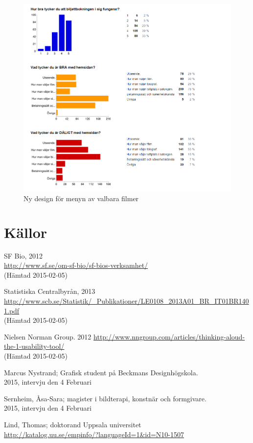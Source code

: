 \documentclass[swedish,a4paper,11pt]{article}
\begin{document}
\begin{figure}[H]
\centering
\includegraphics[scale=0.8]{shart3.PNG} 
\caption{Ny design för menyn av valbara filmer}
\end{figure}


\newpage
\section{Källor}

\begin{enumerate}[label={[\arabic*]}]
  \item SF Bio, 2012  \\
\url{http://www.sf.se/om-sf-bio/sf-bios-verksamhet/}\\{(Hämtad 2015-02-05)}

  \item Statistiska Centralbyrån, 2013\\
\url{http://www.scb.se/Statistik/_Publikationer/LE0108_2013A01_BR_IT01BR1401.pdf}\\{(Hämtad 2015-02-05)
} 
  
  \item Nielsen Norman Group. 2012 \url{http://www.nngroup.com/articles/thinking-aloud-the-1-usability-tool/}\\{(Hämtad 2015-02-05)}  
  
  \item Marcus Nystrand; Grafisk student på Beckmans Designhögskola. \\
2015, intervju den 4 Februari
  
  \item Sernheim, Åsa-Sara; magister i bildterapi, konstnär och formgivare.\\ 
2015, intervju den 4 Februari
  
  \item Lind, Thomas; doktorand Uppsala universitet\\
\url{http://katalog.uu.se/empinfo/?languageId=1&id=N10-1507}
\end{enumerate}
\end{document}
